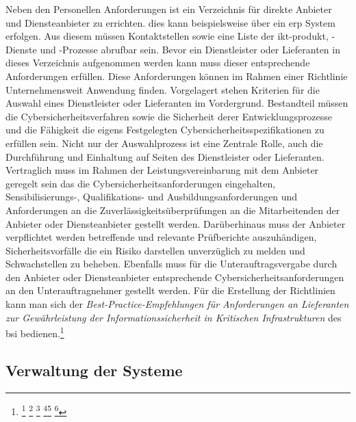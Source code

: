 \documentclass[11pt,a4paper,hidelinks]{article}   %
\begin{document}
            Neben den Personellen Anforderungen ist ein Verzeichnis für direkte Anbieter und Diensteanbieter zu errichten. dies kann beispielsweise über ein \gls{erp} System erfolgen. Aus diesem müssen Kontaktstellen sowie eine Liste der \gls{ikt-produkt}, -Dienste und -Prozesse abrufbar sein. Bevor ein Dienstleister oder Lieferanten in dieses Verzeichnis aufgenommen werden kann muss dieser entsprechende Anforderungen erfüllen. Diese Anforderungen können im Rahmen einer Richtlinie Unternehmensweit Anwendung finden. Vorgelagert stehen Kriterien für die Auswahl eines Dienstleister oder Lieferanten im Vordergrund. Bestandteil müssen die Cybersicherheitsverfahren sowie die Sicherheit derer Entwicklungsprozesse und die Fähigkeit die eigens Festgelegten Cybersicherheitsspezifikationen zu erfüllen sein. Nicht nur der Auswahlprozess ist eine Zentrale Rolle, auch die Durchführung und Einhaltung auf Seiten des Dienstleister oder Lieferanten. Vertraglich muss im Rahmen der Leistungsvereinbarung mit dem Anbieter geregelt sein das die Cybersicherheitsanforderungen eingehalten, Sensibilisierungs-, Qualifikations- und Ausbildungsanforderungen und Anforderungen an die Zuverlässigkeitsüberprüfungen an die Mitarbeitenden der Anbieter oder Diensteanbieter gestellt werden. Darüberhinaus muss der Anbieter verpflichtet werden betreffende und relevante Prüfberichte auszuhändigen, Sicherheitsvorfälle die ein Risiko darstellen unverzüglich zu melden und Schwachstellen zu beheben. Ebenfalls muss für die Unterauftragsvergabe durch den Anbieter oder Diensteanbieter entsprechende Cybersicherheitsanforderungen an den Unterauftragnehmer gestellt werden. Für die Erstellung der Richtlinien kann man sich der \emph{Best-Practice-Empfehlungen für Anforderungen an Lieferanten zur Gewährleistung der Informationssicherheit in Kritischen Infrastrukturen} des \gls{bsi} bedienen.\footnote{
                \footcite[Vgl. Nummer 5.2.][]{EU2024-2690}
                \footcite[Vgl. Nummer 8.2.1.][]{EU2024-2690}
                \footcite[Vgl. Nummer 10.1.2. Buchstabe a und b][]{EU2024-2690}
                \footcite[Vgl. S. 5][Best-Practice-Empfehlungen für Anforderungen an Lieferanten zur Gewährleistung der Informationssicherheit in Kritischen Infrastrukturen]{MISSING}\footcite[Vgl. Nummer 5.1.2.][]{EU2024-2690}
                \footcite[Vgl. Nummer 5.1.4.][]{EU2024-2690}
            }

        \subsection{Verwaltung der Systeme}
\end{document}
